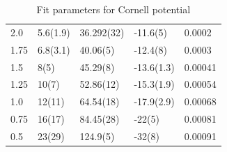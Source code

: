 \begin{table}[!hb]
\begin{tabular}{lllll}
   2.0 & 5.6(1.9) & 36.292(32) & -11.6(5) & 0.0002 \\
   1.75 & 6.8(3.1) & 40.06(5) & -12.4(8) & 0.0003 \\
   1.5 & 8(5) & 45.29(8) & -13.6(1.3) & 0.00041 \\
   1.25 & 10(7) & 52.86(12) & -15.3(1.9) & 0.00054 \\
   1.0 & 12(11) & 64.54(18) & -17.9(2.9) & 0.00068 \\
   0.75 & 16(17) & 84.45(28) & -22(5) & 0.00081 \\
   0.5 & 23(29) & 124.9(5) & -32(8) & 0.00091 \\
\end{tabular}
\caption{Fit parameters for Cornell potential}
\end{table}

